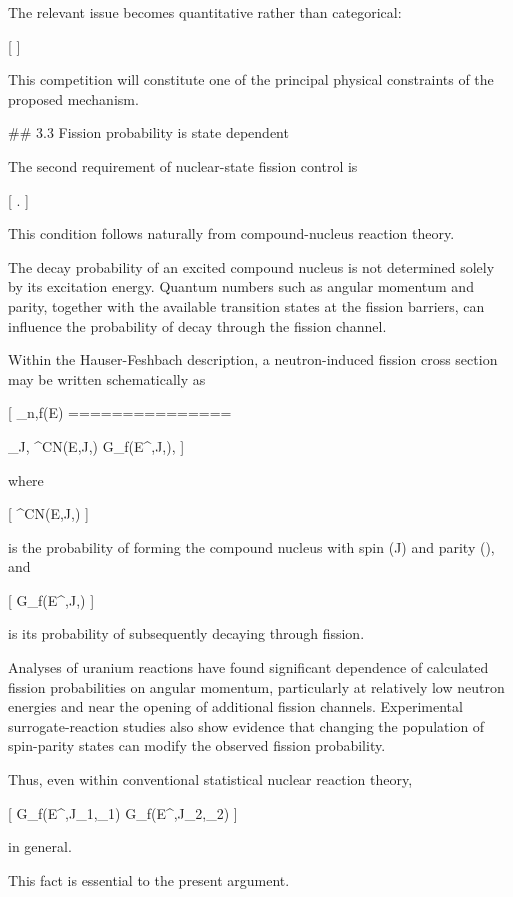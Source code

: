The relevant issue becomes quantitative rather than categorical:

[
]

This competition will constitute one of the principal physical constraints of the proposed mechanism.

## 3.3 Fission probability is state dependent

The second requirement of nuclear-state fission control is

[
.
]

This condition follows naturally from compound-nucleus reaction theory.

The decay probability of an excited compound nucleus is not determined solely by its excitation energy. Quantum numbers such as angular momentum and parity, together with the available transition states at the fission barriers, can influence the probability of decay through the fission channel.

Within the Hauser-Feshbach description, a neutron-induced fission cross section may be written schematically as

[
\sigma_{n,f}(E)
===============

\sum_{J,\pi}
\sigma^{CN}(E,J,\pi)
G_f(E^\ast,J,\pi),
]

where

[
\sigma^{CN}(E,J,\pi)
]

is the probability of forming the compound nucleus with spin (J) and parity (\pi), and

[
G_f(E^\ast,J,\pi)
]

is its probability of subsequently decaying through fission.

Analyses of uranium reactions have found significant dependence of calculated fission probabilities on angular momentum, particularly at relatively low neutron energies and near the opening of additional fission channels. Experimental surrogate-reaction studies also show evidence that changing the population of spin-parity states can modify the observed fission probability.

Thus, even within conventional statistical nuclear reaction theory,

[
G_f(E^\ast,J_1,\pi_1)
\neq
G_f(E^\ast,J_2,\pi_2)
]

in general.

This fact is essential to the present argument.

